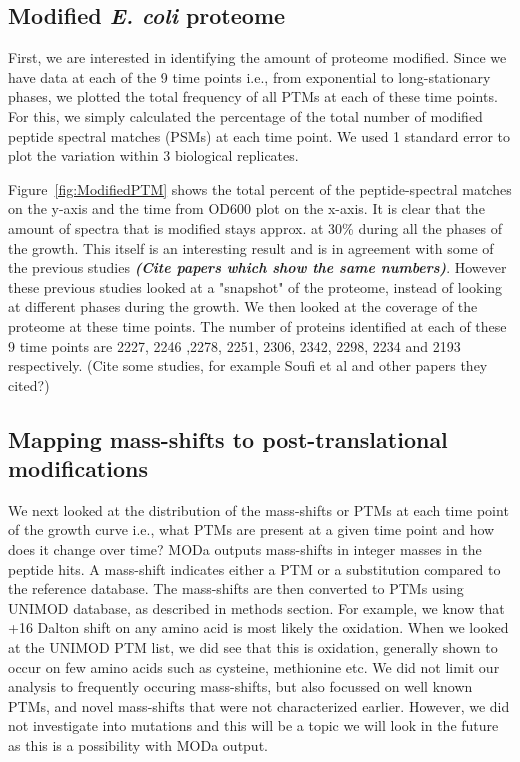 \documentclass[12pt]{article}
\begin{document}
\subsection{Modified \emph{E. coli} proteome}
First, we are interested in identifying the amount of proteome modified. Since we have data at each of the 9 time points i.e., from exponential to long-stationary phases, we plotted the total frequency of all PTMs at each of these time points. For this, we simply calculated the percentage of the total number of modified peptide spectral matches (PSMs) at each time point. We used 1 standard error to plot the variation within 3 biological replicates.

Figure~\ref{fig:ModifiedPTM} shows the total percent of the peptide-spectral matches on the y-axis and the time from OD600 plot on the x-axis. It is clear that the amount of spectra that is modified stays approx. at 30\% during all the phases of the growth. This itself is an interesting result and is in agreement with some of the previous studies \textbf{\emph{(Cite papers which show the same numbers)}}. However these previous studies looked at a "snapshot" of the proteome, instead of looking at different phases during the growth. We then looked at the coverage of the proteome at these time points. The number of proteins identified at each of these 9 time points are 2227, 2246
,2278, 2251, 2306, 2342, 2298, 2234 and 2193 respectively. (Cite some studies, for example Soufi et al and other papers they cited?)

\subsection{Mapping mass-shifts to post-translational modifications}

We next looked at the distribution of the mass-shifts or PTMs at each time point of the growth curve i.e., what PTMs are present at a given time point and how does it change over time? MODa outputs mass-shifts in integer masses in the peptide hits. A mass-shift indicates either a PTM or a substitution compared to the reference database. The mass-shifts are then converted to PTMs using UNIMOD database, as described in methods section. For example, we know that +16 Dalton shift on any amino acid is most likely the oxidation. When we looked at the UNIMOD PTM list, we did see that this is oxidation, generally shown to occur on few amino acids such as cysteine, methionine etc. We did not limit our analysis to frequently occuring mass-shifts, but also focussed on well known PTMs, and novel mass-shifts that were not characterized earlier. However, we did not investigate into mutations and this will be a topic we will look in the future as this is a possibility with MODa output.
\end{document}
